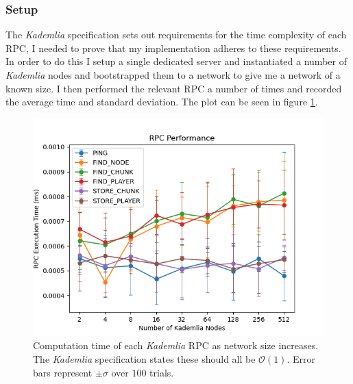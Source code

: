 \documentclass[10pt,twoside,notitlepage,a4paper]{report}
\newcommand{\kademlia}{\emph{Kademlia}}
\begin{document}
	\subsubsection{Setup}
	The \kademlia{} specification sets out requirements for the time complexity of each RPC, I needed to prove that my implementation adheres to these requirements. In order to do this I setup a single dedicated server and instantiated a number of \kademlia{} nodes and bootstrapped them to a network to give me a network of a known size. I then performed the relevant RPC a number of times and recorded the average time and standard deviation. The plot can be seen in figure \ref{fig:kadperforma}.
	\begin{figure}
		\includegraphics[width=\textwidth]{rpcperformance.png}
		\caption[RPC Performance]{Computation time of each \kademlia{} RPC as network size increases. The \kademlia{} specification states these should all be $\mathcal{O}(1)$. Error bars represent $\pm\sigma$ over $100$ trials.}
		\label{fig:kadperforma}
	\end{figure}
\end{document}
